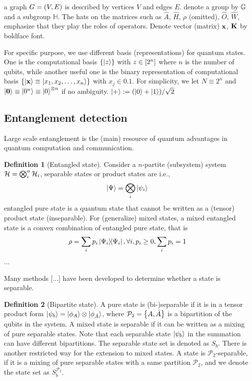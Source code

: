 \documentclass[
10pt,
aps,
pra,
linenumbers,
floatfix,
]{revtex4-2}
\theoremstyle{plain}
\theoremstyle{definition}
\newtheorem{definition}{Definition}
\newtheorem{example}{Example}
\newcommand{\hamiltonian}{\hat{H}}
\newcommand{\ew}{\hat{W}}
\newcommand{\ob}{\hat{O}}
\newcommand{\subgroup}{\mathbb{H}}
\newcommand{\ppartition}{\mathcal{P}}
\newcommand{\dm}{\rho}
\begin{document}
a graph $G=(V,E)$ is described by vertices $V$ and edges $E$.
denote a group by $\mathbb{G}$ and a subgroup $\subgroup$. 
The hats on the matrices such as $\hat{A}$, $\hamiltonian$, $\dm$ (omitted), $\ob$, $\ew$, emphasize that they play the roles of operators.
Denote vector (matrix) $\vb{x}$, $\vb{K}$ by boldface font.

For specific purpose, we use different basis (representations) for quantum states.
One is the computational basis $\qty{\ket{z}}$ with $z\in \qty[2^n]$ where $n$ is the number of qubits,
while another useful one is the binary representation of computational basis $\qty{\ket{\vb{x}}\equiv\ket{x_1,x_2,\dots,x_n}}$ with $x_j\in \qty{0,1}$. 
For simplicity, we let $N \equiv 2^n$ and $\ket{\vb{0}}\equiv\ket{0^n} \equiv\ket{0}^{\otimes n}$ if no ambiguity.
$\ket{+}: = (\ket{0}+\ket{1})/\sqrt{2} $

\subsection{Entanglement detection}
Large scale entanglement is the (main) resource of quantum advantages in quantum computation and communication.
\begin{definition}[Entangled state]\label{def:entangled_state}
	Consider a $n$-partite (subsystem) system $\mathcal{H}=\bigotimes_i^n \mathcal{H}_i$,
	separable states or product states are i.e.,
	\begin{equation}
		\ket{\Psi} = \bigotimes_i \ket{\psi_i}
	\end{equation}
	entangled pure state is a quantum state that cannot be written as a (tensor) product state (inseparable). 
	For (generalize) mixed states, a mixed entangled state is a convex combination of entangled pure state, that is
	\begin{equation}
		\rho = \sum_i p_i\op{\Psi_i},\forall i,p_i\ge 0, \sum_i p_i =1
	\end{equation}
		...
\end{definition}
Many methods [...] have been developed to determine whether a state is separable.
\begin{definition}[Bipartite state]
	A pure state is (bi-)separable if it is in a tensor product form $\ket{\psi_b}=\ket{\phi_A}\otimes\ket{\phi_{\bar{A}}}$, 
	where $\ppartition_2 = \qty{ A, \bar{A} }$ is a bipartition of the qubits in the system.
	A mixed state is separable if it can be written as a mixing of pure separable states.
	Note that each separable state $\ket{\psi_b}$ in the summation can have different bipartitions.
	The separable state set is denoted as $S_b$.
	There is another restricted way for the extension to mixed states. 
	A state is $\ppartition_2$-separable, if it is a mixing of pure separable states with a same partition $\ppartition_2$, 
	and we denote the state set as $S_b^{\ppartition_2}$. 
\end{definition}
\end{document}
